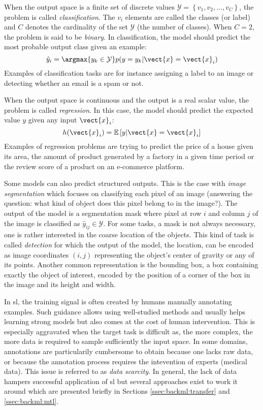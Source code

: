 When the output space is a finite set of discrete values
$\mathcal{Y} = \left\{v_1, v_2, ..., v_C\right\}$, the problem is called
\textit{classification}. The $v_i$ elements are called the classes (or label) and
$C$ denotes the cardinality of the set $\mathcal{Y}$ (\ie the number of classes).
When $C = 2$, the problem is said to be \textit{binary}. In classification, the
model should predict the most probable output class given an example:
\begin{equation}
\hat{y}_i = \argmax{y_k \in \mathcal{Y}} p(y=y_k|\vect{x}=\vect{x}_i)
\end{equation}
Examples of classification tasks are for instance assigning a label to an image
or detecting whether an email is a spam or not.

When the output space is continuous and the output is a real scalar value, the
problem is called \textit{regression}. In this case, the model should predict the
expected value $y$ given any input $\vect{x}_i$:
\begin{equation}
h(\vect{x}_i) = \mathbb{E}\left[y|\vect{x}=\vect{x}_i\right]
\end{equation}
Examples of regression problems are trying to predict the price of a house given
its area, the amount of product generated by a factory in a given time period or
the review score of a product on an e-commerce platform.

Some models can also predict structured outputs. This is the case with
\textit{image segmentation} which focuses on classifying each pixel of an image
(\ie answering the question: what kind of object does this pixel belong to in the image?). The output of
the model is a segmentation mask where pixel at row $i$ and column $j$ of the
image is classified as $\hat{y}_{ij} \in \mathcal{Y}$. For some tasks, a mask is
not always necessary, one is rather interested in the coarse location of the
objects. This kind of task is called \textit{detection} for which the output of the
model, the location, can be encoded as image coordinates $(i, j)$ representing
the object's center of gravity or any of its points. Another common representation
is the bounding box, a box containing exactly the object of interest, encoded by
the position of a corner of the box in the image and its height and width.

In \acrlong{sl}, the training signal is often created by humans manually annotating
examples. Such guidance allows using well-studied methods and usually helps learning
strong models but also comes at the cost of human intervention. This is especially
aggravated when the target task is difficult as, the more complex, the more data
is required to sample sufficiently the input space. In some domains, annotations
are particularily cumbersome to obtain because one lacks raw data, or because the
annotation process requires the intevention of experts (\eg medical data). This
issue is referred to as \textit{data scarcity}. In general, the lack of data
hampers successful application of \acrlong{sl} but several approaches exist
to work it around which are presented briefly in Sections \ref{ssec:backml:transfer}
and \ref{ssec:backml:mtl}.

